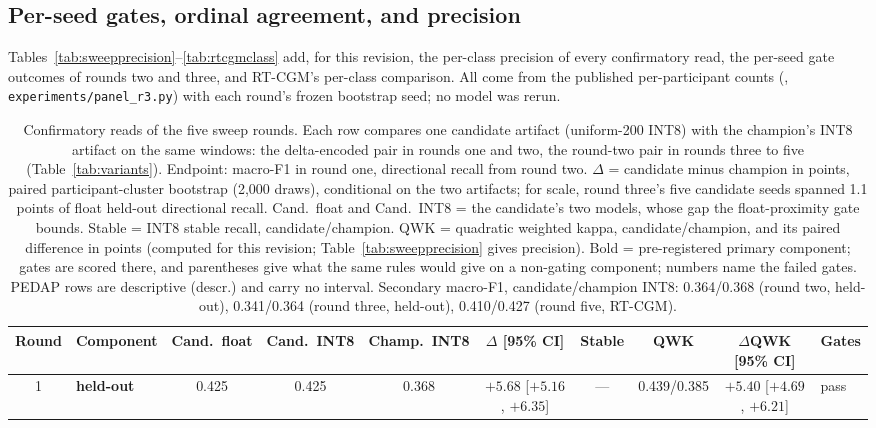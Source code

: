 \documentclass[10pt,twocolumn]{article}
\begin{document}
\subsection{Per-seed gates, ordinal agreement, and precision}

Tables~\ref{tab:sweepprecision}--\ref{tab:rtcgmclass} add, for this
revision, the per-class precision of every confirmatory read, the
per-seed gate outcomes of rounds two and three, and RT-CGM's per-class
comparison. All come from the
published per-participant counts (,
\texttt{experiments/panel\_r3.py}) with each round's frozen bootstrap
seed; no model was rerun.

\begin{table}[!tp]
\centering
\caption{Confirmatory reads of the five sweep rounds. Each row compares
one candidate artifact (uniform-200 INT8) with the champion's INT8
artifact on the same windows: the delta-encoded pair in rounds one and
two, the round-two pair in rounds three to five
(Table~\ref{tab:variants}). Endpoint: macro-F1 in round one, directional
recall from round two. $\Delta$ = candidate minus champion in points,
paired participant-cluster bootstrap (2,000 draws), conditional on the two
artifacts; for scale, round three's five candidate seeds spanned 1.1
points of float held-out directional recall. Cand.\ float and Cand.\ INT8
= the candidate's two models, whose gap the float-proximity gate bounds.
Stable = INT8 stable recall, candidate/champion. QWK = quadratic weighted
kappa, candidate/champion, and its paired difference in points (computed
for this revision; Table~\ref{tab:sweepprecision} gives precision). Bold
= pre-registered primary component; gates are scored there, and
parentheses give what the same rules would give on a non-gating
component; numbers name the failed gates. PEDAP rows are descriptive (descr.) and carry no interval. Secondary
macro-F1, candidate/champion INT8: 0.364/0.368 (round two, held-out),
0.341/0.364 (round three, held-out), 0.410/0.427 (round five, RT-CGM).}
\label{tab:sweep}\label{tab:sweeptwo}\label{tab:sweepthree}\label{tab:sweepfive}
\scriptsize
\setlength{\tabcolsep}{2.5pt}
\begin{tabular}{@{}clcccccccl@{}}
\toprule
Round & Component & Cand.\ float & Cand.\ INT8 & Champ.\ INT8 & $\Delta$ [95\% CI] & Stable & QWK & $\Delta$QWK [95\% CI] & Gates \\
\midrule
1 & \textbf{held-out} & 0.425 & 0.425 & 0.368 & $+5.68$ [$+5.16$, $+6.35$] & --- & 0.439/0.385 & $+5.40$ [$+4.69$, $+6.21$] & pass \\

\end{tabular}
\end{table}
\end{document}
